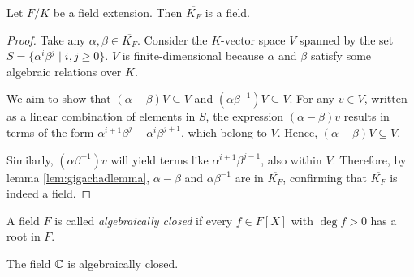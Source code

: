 \begin{theorem}
  Let $F/K$ be a field extension. Then $\overline{K_F}$ is a field.
  \label{<+label+>}
\end{theorem}
\begin{proof}
      Take any $\alpha, \beta \in \overline{K_F}$. Consider the $K$-vector space $V$ spanned by the set $S = \{\alpha^i \beta^j \mid i,j \geq 0\}$. $V$ is finite-dimensional because $\alpha$ and $\beta$ satisfy some algebraic relations over $K$.

  We aim to show that $(\alpha - \beta)V \subseteq V$ and $(\alpha\beta^{-1})V \subseteq V$. For any $v \in V$, written as a linear combination of elements in $S$, the expression $(\alpha - \beta)v$ results in terms of the form $\alpha^{i+1}\beta^{j} - \alpha^{i}\beta^{j+1}$, which belong to $V$. Hence, $(\alpha - \beta)V \subseteq V$.

  Similarly, $(\alpha\beta^{-1})v$ will yield terms like $\alpha^{i+1}\beta^{j-1}$, also within $V$. Therefore, by lemma \ref{lem:gigachadlemma}, $\alpha - \beta$ and $\alpha\beta^{-1}$ are in $\overline{K_F}$, confirming that $\overline{K_F}$ is indeed a field.
\end{proof}
\begin{definition}
  A field $F$ is called \emph{algebraically closed} if every $f\in F[X]$ with $\deg f>0$ has a
  root in $F$.
  \label{<+label+>}
\end{definition}

\begin{theorem}
  The field $\mathbb C$ is algebraically closed.
  \label{meow}
\end{theorem}

